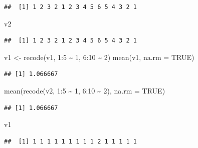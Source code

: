 \documentclass[
]{book}
\newenvironment{Shaded}{\begin{snugshade}}{\end{snugshade}}
\newcommand{\AttributeTok}[1]{\textcolor[rgb]{0.77,0.63,0.00}{#1}}
\newcommand{\ConstantTok}[1]{\textcolor[rgb]{0.00,0.00,0.00}{#1}}
\newcommand{\DecValTok}[1]{\textcolor[rgb]{0.00,0.00,0.81}{#1}}
\newcommand{\FunctionTok}[1]{\textcolor[rgb]{0.00,0.00,0.00}{#1}}
\newcommand{\NormalTok}[1]{#1}
\newcommand{\OtherTok}[1]{\textcolor[rgb]{0.56,0.35,0.01}{#1}}
\newcommand{\SpecialCharTok}[1]{\textcolor[rgb]{0.00,0.00,0.00}{#1}}
\begin{document}
\begin{verbatim}
##  [1] 1 2 3 2 1 2 3 4 5 6 5 4 3 2 1
\end{verbatim}

\begin{Shaded}
\begin{Highlighting}[]
\NormalTok{v2}
\end{Highlighting}
\end{Shaded}

\begin{verbatim}
##  [1] 1 2 3 2 1 2 3 4 5 6 5 4 3 2 1
\end{verbatim}

\begin{Shaded}
\begin{Highlighting}[]
\NormalTok{v1 }\OtherTok{\textless{}{-}} \FunctionTok{recode}\NormalTok{(v1, }\DecValTok{1}\SpecialCharTok{:}\DecValTok{5} \SpecialCharTok{\textasciitilde{}} \DecValTok{1}\NormalTok{, }\DecValTok{6}\SpecialCharTok{:}\DecValTok{10} \SpecialCharTok{\textasciitilde{}} \DecValTok{2}\NormalTok{)}
\FunctionTok{mean}\NormalTok{(v1, }\AttributeTok{na.rm =} \ConstantTok{TRUE}\NormalTok{)}
\end{Highlighting}
\end{Shaded}

\begin{verbatim}
## [1] 1.066667
\end{verbatim}

\begin{Shaded}
\begin{Highlighting}[]
\FunctionTok{mean}\NormalTok{(}\FunctionTok{recode}\NormalTok{(v2, }\DecValTok{1}\SpecialCharTok{:}\DecValTok{5} \SpecialCharTok{\textasciitilde{}} \DecValTok{1}\NormalTok{, }\DecValTok{6}\SpecialCharTok{:}\DecValTok{10} \SpecialCharTok{\textasciitilde{}} \DecValTok{2}\NormalTok{), }\AttributeTok{na.rm =} \ConstantTok{TRUE}\NormalTok{)}
\end{Highlighting}
\end{Shaded}

\begin{verbatim}
## [1] 1.066667
\end{verbatim}

\begin{Shaded}
\begin{Highlighting}[]
\NormalTok{v1}
\end{Highlighting}
\end{Shaded}

\begin{verbatim}
##  [1] 1 1 1 1 1 1 1 1 1 2 1 1 1 1 1
\end{verbatim}
\end{document}
